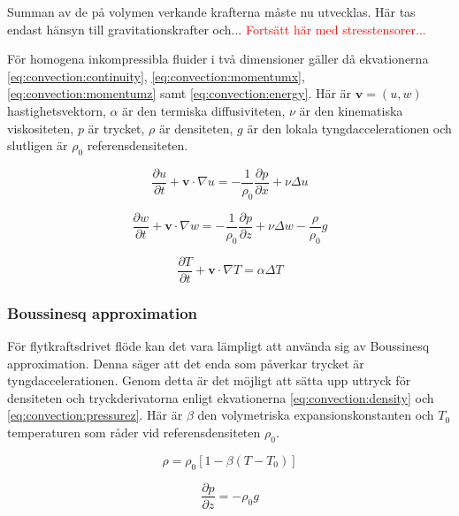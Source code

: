 Summan av de på volymen verkande krafterna måste nu utvecklas. Här tas endast hänsyn till gravitationskrafter och... \textcolor{red}{Fortsätt här med stresstensorer...}


För homogena inkompressibla fluider i två dimensioner gäller då ekvationerna
\eqref{eq:convection:continuity}, \eqref{eq:convection:momentumx},
\eqref{eq:convection:momentumz} samt \eqref{eq:convection:energy}. Här
är $\mathbf{v} = (u,w)$ hastighetsvektorn, $\alpha$ är den termiska
diffusiviteten, $\nu$ är den kinematiska viskositeten, $p$ är trycket,
$\rho$ är densiteten, $g$ är den lokala tyngdaccelerationen
och slutligen är $\rho_0$ referensdensiteten.

\begin{equation}
\label{eq:convection:momentumx}
\frac{\partial u}{\partial t} + \mathbf{v}\cdot\nabla u = 
-\frac{1}{\rho_0}\frac{\partial p}{\partial x} + 
\nu\Delta u
\end{equation}

\begin{equation}
\label{eq:convection:momentumz}
\frac{\partial w}{\partial t} + \mathbf{v}\cdot\nabla w = 
-\frac{1}{\rho_0}\frac{\partial p}{\partial z} + \nu\Delta w - \frac{\rho}{\rho_0}g
\end{equation}

\begin{equation}
\label{eq:convection:energy}
\frac{\partial T}{\partial t} + \mathbf{v}\cdot\nabla T = \alpha\Delta T
\end{equation}

\subsubsection{Boussinesq approximation}

För flytkraftsdrivet flöde kan det vara lämpligt att använda sig av
Boussinesq approximation. Denna säger att det enda som påverkar trycket är
tyngdaccelerationen. Genom detta är det möjligt att sätta upp uttryck för densiteten
och tryckderivatorna enligt ekvationerna \eqref{eq:convection:density}
och \eqref{eq:convection:pressurez}. Här är
$\beta$ den volymetriska expansionskonstanten och
$T_0$ temperaturen som råder vid referensdensiteten $\rho_0$.

\begin{equation}
\label{eq:convection:density}
\rho = \rho_0[1-\beta(T-T_0)]
\end{equation}

\begin{equation}
\label{eq:convection:pressurez}
\frac{\partial p}{\partial z} = -\rho_0g
\end{equation}


